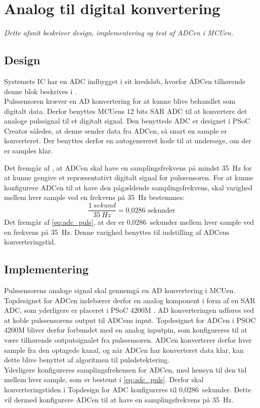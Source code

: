 \section{Analog til digital konvertering} \label{adc_design_impl}
\textit{Dette afsnit beskriver design, implementering og test af ADCen i MCUen.}

\subsection{Design}
Systemets IC har en ADC indbygget i sit kredsløb, hvorfor ADCen tilhørende denne blok beskrives i .\\
Pulssensoren kræver en AD konvertering for at kunne blive behandlet som digitalt data. Derfor benyttes MCUens 12 bits SAR ADC til at konvertere det analoge pulssignal til et digitalt signal. Den benyttede ADC er designet i PSoC Creator således, at denne sender data fra ADCen, så snart en sample er konverteret. Der benyttes derfor en autogenereret kode til at undersøge, om der er samples klar. 

Det fremgår af , at ADCen skal have en samplingsfrekvens på mindst 35~Hz for at kunne gengive et repræsentativt digitalt signal for pulssensoren. For at kunne konfigurere ADCen til at have den pågældende samplingsfrekvens, skal varighed mellem hver sample ved en frekvens på 35~Hz bestemmes:
\begin{equation}
\frac{1~sekund}{35~Hz} = \text{0,0286~sekunder}
\label{eq:adc_puls}
\end{equation}
Det fremgår af \eqref{eq:adc_puls}, at der er 0,0286~sekunder mellem hver sample ved en frekvens på 35~Hz. Denne varighed benyttes til indstilling af ADCens konverteringstid.

\subsection{Implementering}
Pulssensorens analoge signal skal gennemgå en AD konvertering i MCUen. Topdesignet for ADCen indebærer derfor en analog komponent i form af en SAR ADC, som yderligere er placeret i PSoC 4200M \citep{Murphy2016}. AD konverteringen udføres ved at koble pulssensorens output til ADCens input. Topdesignet for ADCen i PSOC 4200M bliver derfor forbundet med en analog inputpin, som konfigureres til at være tilhørende outputsignalet fra pulssensoren. ADCen konverterer derfor hver sample fra den optagede kanal, og når ADCen har konverteret data klar, kan dette blive benyttet af algoritmen til pulsdetektering. \\
Yderligere konfigureres samplingsfrekensen for ADCen, med hensyn til den tid mellem hver sample, som er bestemt i \eqref{eq:adc_puls}. Derfor skal konverteringstiden i Topdesign for ADC konfigureres til 0,0286~sekunder. Dette vil dermed konfigurere ADCen til at have en samplingsfrekvens på 35~Hz.

